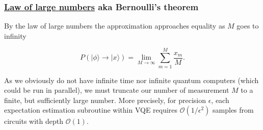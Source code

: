 \documentclass{beamer}
\begin{document}
\begin{frame}
\frametitle{\href{{https://en.wikipedia.org/wiki/Law_of_large_numbers}}{Law of large numbers} aka Bernoulli's theorem}

By the law of large numbers the approximation approaches equality as
$M$ goes to infinity

\[
P(\vert \phi\rangle\to \vert x\rangle) = \lim_{M\to\infty}\sum_{m=1}^M\frac{x_m}{M}.
\]

As we obviously do not have infinite time nor infinite quantum
computers (which could be run in parallel), we must truncate our
number of measurement $M$ to a finite, but sufficiently large
number. More precisely, for precision $\epsilon$, each expectation
estimation subroutine within VQE requires $\mathcal{O}(1/\epsilon^2)$
samples from circuits with depth $\mathcal{O}(1)$.
\end{frame}
\end{document}
